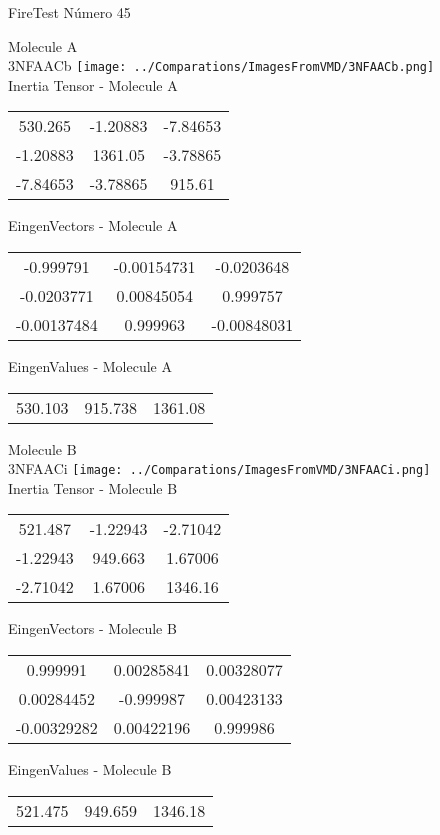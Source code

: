 \vtab[-2cm]
\begin{center}
{\large FireTest \tab Número 45}
\end{center}
\begin{multicols}{2}
\begin{center}

Molecule A \\ 
3NFAACb
\texttt{[image: ../Comparations/ImagesFromVMD/3NFAACb.png]}
\\
Inertia Tensor - Molecule A \\
\vtab

\begin{tabular}{|c c c|}
530.265	 & 	-1.20883	 & 	-7.84653	 \\
-1.20883	 & 	1361.05	 & 	-3.78865	 \\
-7.84653	 & 	-3.78865	 & 	915.61
\end{tabular}

\vtab
 EingenVectors - Molecule A     \\
\vtab
\begin{tabular}{|c c c|}
-0.999791	 & 	-0.00154731	 & 	-0.0203648	 \\
-0.0203771	 & 	0.00845054	 & 	0.999757	 \\
-0.00137484	 & 	0.999963	 & 	-0.00848031
\end{tabular}

\vtab
 EingenValues - Molecule A     \\
\vtab
\begin{tabular}{|c c c|}
530.103	 & 	915.738	 & 	1361.08	 \\
\end{tabular}
\columnbreak

Molecule B \\ 
3NFAACi
\texttt{[image: ../Comparations/ImagesFromVMD/3NFAACi.png]}
\\
Inertia Tensor - Molecule B \\
\vtab

\begin{tabular}{|c c c|}
521.487	 & 	-1.22943	 & 	-2.71042	 \\
-1.22943	 & 	949.663	 & 	1.67006	 \\
-2.71042	 & 	1.67006	 & 	1346.16
\end{tabular}

\vtab
 EingenVectors - Molecule B     \\
\vtab
\begin{tabular}{|c c c|}
0.999991	 & 	0.00285841	 & 	0.00328077	 \\
0.00284452	 & 	-0.999987	 & 	0.00423133	 \\
-0.00329282	 & 	0.00422196	 & 	0.999986
\end{tabular}

\vtab
 EingenValues - Molecule B     \\
\vtab
\begin{tabular}{|c c c|}
521.475	 & 	949.659	 & 	1346.18	 \\
\end{tabular}

\end{center}
\end{multicols}
